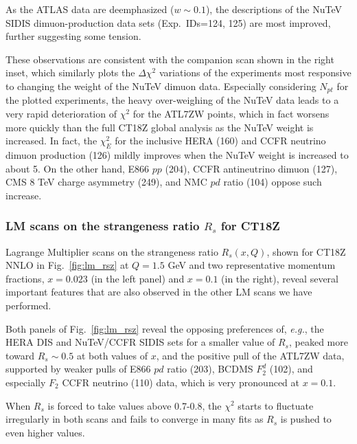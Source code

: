 As the ATLAS data are deemphasized ($w\!\sim\!0.1$),
the descriptions of the NuTeV SIDIS
dimuon-production data sets (Exp.~IDs=124, 125) are most improved,
further suggesting some tension.

These observations are consistent with the companion scan shown in
the right inset, which
similarly plots the $\Delta \chi^2$ variations of the experiments most
responsive to changing the weight of the NuTeV dimuon data.
Especially considering $N_{pt}$ for the plotted
experiments, the heavy over-weighing of the NuTeV data
leads to a very rapid deterioration of $\chi^2$ for the ATL7ZW points,
which in fact worsens more quickly than the full
CT18Z global analysis as the NuTeV weight is increased.
In fact, the $\chi^2_E$ for the inclusive HERA (160) and CCFR neutrino
dimuon production (126) mildly improves when the NuTeV weight is
increased to about 5. On the other hand, E866 $pp$ (204), CCFR
antineutrino dimuon (127), CMS 8 TeV charge asymmetry (249), and NMC $pd$
ratio (104) oppose such increase. 


\subsubsection{LM scans on the strangeness ratio $R_s$ for CT18Z}
\label{sec:LMRsCT18Z}

Lagrange Multiplier scans on the strangeness ratio $R_s(x,Q)$, shown
for CT18Z NNLO in Fig.~\ref{fig:lm_rsz} at $Q\!=\!1.5$ GeV and two
representative momentum fractions, 
$x\!=\!0.023$ (in the left panel) and $x\!=\!0.1$ (in the right),
reveal several important features that are also observed in the other
LM scans we have performed. 

 Both panels of Fig.~\ref{fig:lm_rsz} reveal the opposing preferences
of, {\it e.g.}, the HERA DIS and NuTeV/CCFR SIDIS sets for a smaller value of
$R_s$, peaked more toward $R_s\!\sim\! 0.5$ at both values of $x$,
and the positive pull of the ATL7ZW data, supported by weaker pulls of
E866 $pd$ ratio (203), BCDMS $F_2^d$ (102), and especially
$F_2$ CCFR neutrino (110) data, which is very pronounced at $x=0.1$.

 When $R_s$ is forced to take values above 0.7-0.8, the $\chi^2$
starts to fluctuate irregularly in both scans and fails to converge in
many fits as $R_s$ is pushed to even higher values.

